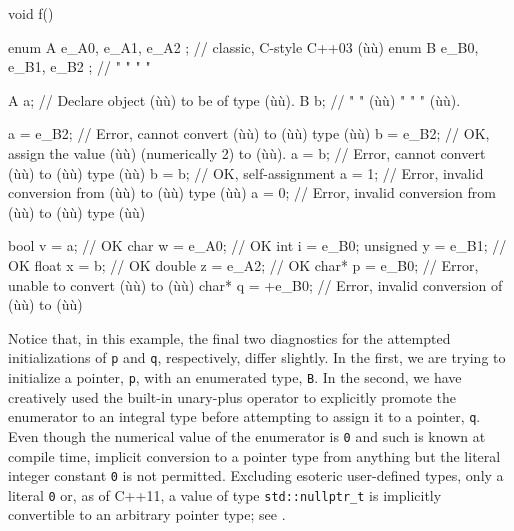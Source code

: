 \begin{emcppslisting}
void f()
{
    enum A { e_A0, e_A1, e_A2 };  // classic, C-style C++03 (ù{}ù)
    enum B { e_B0, e_B1, e_B2 };  //    "       "       "     "

    A a;  // Declare object (ù{}ù) to be of type (ù{}ù).
    B b;  //   "       "    (ù{}ù)  " "  "       (ù{}ù).

    a = e_B2;  // Error, cannot convert (ù{}ù) to (ù{}ù) type (ù{}ù)
    b = e_B2;  // OK, assign the value (ù{}ù) (numerically 2) to (ù{}ù).
    a = b;     // Error, cannot convert (ù{}ù) to (ù{}ù) type (ù{}ù)
    b = b;     // OK, self-assignment
    a = 1;     // Error, invalid conversion from (ù{}ù) to (ù{}ù) type (ù{}ù)
    a = 0;     // Error, invalid conversion from (ù{}ù) to (ù{}ù) type (ù{}ù)

    bool     v = a;     // OK
    char     w = e_A0;  // OK
    int      i = e_B0;
    unsigned y = e_B1;  // OK
    float    x = b;     // OK
    double   z = e_A2;  // OK
    char*    p = e_B0;  // Error, unable to convert (ù{}ù) to (ù{}ù)
    char*    q = +e_B0; // Error, invalid conversion of (ù{}ù) to (ù{}ù)
}
\end{emcppslisting}

\noindent Notice that, in this example, the final two diagnostics for the
attempted initializations of \lstinline!p! and \lstinline!q!, respectively,
differ slightly. In the first, we are trying to initialize a pointer,
\lstinline!p!, with an enumerated type, \lstinline!B!. In the second, we have
creatively used the built-in unary-plus operator to explicitly promote
the enumerator to an integral type before attempting to assign it to a
pointer, \lstinline!q!. Even though the numerical value of the enumerator
is \lstinline!0! and such is known at compile time, implicit
conversion to a pointer type from anything but the literal integer
constant \lstinline!0! is not
permitted. Excluding esoteric user-defined
types, only a literal \lstinline!0! or, as of C++11, a value of type
\lstinline!std::nullptr_t! is implicitly convertible to an arbitrary
  pointer type; see .

